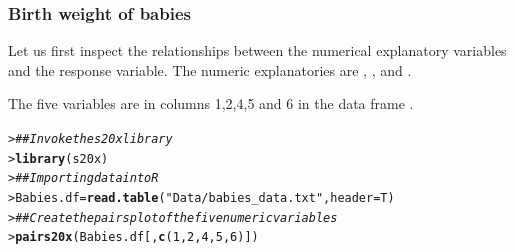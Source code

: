 \documentclass{beamer}\usepackage[]{graphicx}\usepackage[]{xcolor}
\makeatletter
\newcommand{\hlnum}[1]{\textcolor[rgb]{0.686,0.059,0.569}{#1}}%
\newcommand{\hlstr}[1]{\textcolor[rgb]{0.192,0.494,0.8}{#1}}%
\newcommand{\hlcom}[1]{\textcolor[rgb]{0.678,0.584,0.686}{\textit{#1}}}%
\newcommand{\hlstd}[1]{\textcolor[rgb]{0.345,0.345,0.345}{#1}}%
\newcommand{\hlkwb}[1]{\textcolor[rgb]{0.69,0.353,0.396}{#1}}%
\newcommand{\hlkwc}[1]{\textcolor[rgb]{0.333,0.667,0.333}{#1}}%
\newcommand{\hlkwd}[1]{\textcolor[rgb]{0.737,0.353,0.396}{\textbf{#1}}}%
\newenvironment{kframe}{%
 \def\at@end@of@kframe{}%
 \ifinner\ifhmode%
  \def\at@end@of@kframe{\end{minipage}}%
  \begin{minipage}{\columnwidth}%
 \fi\fi%
 \def\FrameCommand##1{\hskip\@totalleftmargin \hskip-\fboxsep
 \colorbox{shadecolor}{##1}\hskip-\fboxsep
     \hskip-\linewidth \hskip-\@totalleftmargin \hskip\columnwidth}%
 \MakeFramed {\advance\hsize-\width
   \@totalleftmargin\z@ \linewidth\hsize
   \@setminipage}}%
 {\par\unskip\endMakeFramed%
 \at@end@of@kframe}
\newenvironment{knitrout}{}{} %
\makeatother
\begin{document}
\begin{frame}[fragile]
\frametitle{Birth weight of babies}
Let us first inspect the relationships between the numerical explanatory variables and the response variable. 
The numeric explanatories are , ,    and . 

\bigskip
The five variables are in columns 1,2,4,5  and 6 in the data frame .

\bigskip
\begin{knitrout}\scriptsize
{}\color{fgcolor}\begin{kframe}
\begin{alltt}
\hlstd{> }\hlcom{## Invoke the s20x library}
\hlstd{> }\hlkwd{library}\hlstd{(s20x)}
\hlstd{> }\hlcom{## Importing data into R}
\hlstd{> }\hlstd{Babies.df} \hlkwb{=} \hlkwd{read.table}\hlstd{(}\hlstr{"Data/babies_data.txt"}\hlstd{,} \hlkwc{header}\hlstd{=T)}
\hlstd{> }\hlcom{## Create the pairs plot of the five numeric variables}
\hlstd{> }\hlkwd{pairs20x}\hlstd{(Babies.df[,}\hlkwd{c}\hlstd{(}\hlnum{1}\hlstd{,}\hlnum{2}\hlstd{,}\hlnum{4}\hlstd{,}\hlnum{5}\hlstd{,}\hlnum{6}\hlstd{)])}
\end{alltt}
\end{kframe}
\end{knitrout}
\end{frame}
\end{document}
